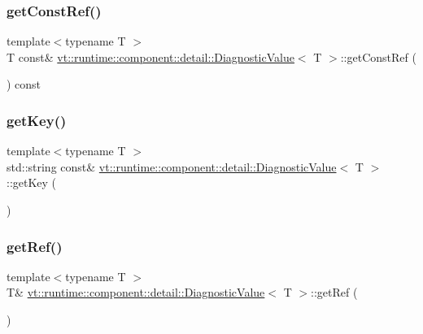 \subsubsection{\texorpdfstring{get\+Const\+Ref()}{getConstRef()}}
{\footnotesize\ttfamily template$<$typename T $>$ \\
T const\& \hyperlink{structvt_1_1runtime_1_1component_1_1detail_1_1_diagnostic_value}{vt\+::runtime\+::component\+::detail\+::\+Diagnostic\+Value}$<$ T $>$\+::get\+Const\+Ref (\begin{DoxyParamCaption}{ }\end{DoxyParamCaption}) const\hspace{0.3cm}{\ttfamily [inline]}}

\mbox{\label{structvt_1_1runtime_1_1component_1_1detail_1_1_diagnostic_value_a3db26a4eb88f34da6872f435f3310406}} 
\subsubsection{\texorpdfstring{get\+Key()}{getKey()}}
{\footnotesize\ttfamily template$<$typename T $>$ \\
std\+::string const\& \hyperlink{structvt_1_1runtime_1_1component_1_1detail_1_1_diagnostic_value}{vt\+::runtime\+::component\+::detail\+::\+Diagnostic\+Value}$<$ T $>$\+::get\+Key (\begin{DoxyParamCaption}{ }\end{DoxyParamCaption})\hspace{0.3cm}{\ttfamily [inline]}}

\mbox{\label{structvt_1_1runtime_1_1component_1_1detail_1_1_diagnostic_value_a1a7da0106345e32a753d8ee8e1df29c9}} 
\subsubsection{\texorpdfstring{get\+Ref()}{getRef()}}
{\footnotesize\ttfamily template$<$typename T $>$ \\
T\& \hyperlink{structvt_1_1runtime_1_1component_1_1detail_1_1_diagnostic_value}{vt\+::runtime\+::component\+::detail\+::\+Diagnostic\+Value}$<$ T $>$\+::get\+Ref (\begin{DoxyParamCaption}{ }\end{DoxyParamCaption})\hspace{0.3cm}{\ttfamily [inline]}}



